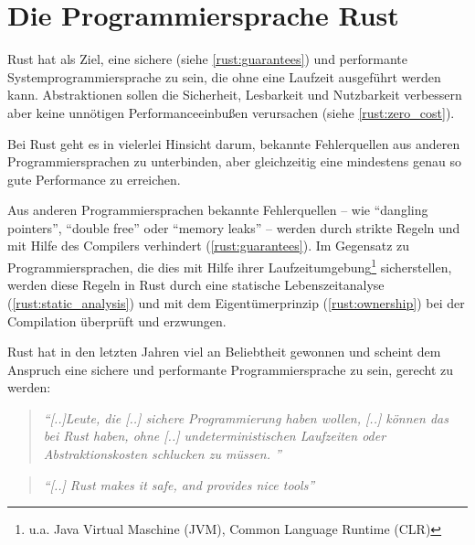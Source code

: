 
\chapter{Die Programmiersprache Rust}

Rust hat als Ziel, eine sichere (siehe \autoref{rust:guarantees}) und performante Systemprogrammiersprache zu sein, die ohne eine Laufzeit ausgeführt werden kann.
Abstraktionen sollen die Sicherheit, Lesbarkeit und Nutzbarkeit verbessern aber keine unnötigen Performanceeinbußen verursachen (siehe \autoref{rust:zero_cost}).


Bei Rust geht es in vielerlei Hinsicht darum, bekannte Fehlerquellen aus anderen Programmiersprachen zu unterbinden, aber gleichzeitig eine mindestens genau so gute Performance zu erreichen.

Aus anderen Programmiersprachen bekannte Fehlerquellen -- wie \enquote{dangling pointers}, \enquote{double free} oder \enquote{memory leaks} --  werden durch strikte Regeln und mit Hilfe des Compilers verhindert (\autoref{rust:guarantees}).
Im Gegensatz zu Programmiersprachen, die dies mit Hilfe ihrer Laufzeitumgebung\footnote{u.a. Java Virtual Maschine (JVM), Common Language Runtime (CLR)} sicherstellen, werden diese Regeln in Rust durch eine statische Lebenszeitanalyse (\autoref{rust:static_analysis}) und mit dem Eigentümerprinzip (\autoref{rust:ownership}) bei der Compilation überprüft und erzwungen.

Rust hat in den letzten Jahren viel an Beliebtheit gewonnen und scheint dem Anspruch eine sichere und performante Programmiersprache zu sein, gerecht zu werden:

\begin{quotation}
	\textit{\enquote{[..]Leute, die [..] sichere Programmierung haben wollen, [..] können das bei Rust haben, ohne [..] undeterministischen Laufzeiten oder Abstraktionskosten schlucken zu müssen. }}
	\cite[Felix von Leitner in einem Blogeintrag]{rust:fefe}
\end{quotation}

\begin{quotation}
	\textit{\enquote{[..] Rust makes it safe, and  provides nice tools}} 
	\cite[Folie 130, Federico Mena-Quintero in \enquote{Ersetzen von C Bibliotheken durch Rust}]{rust:c_is_hostile_mena}
\end{quotation}


